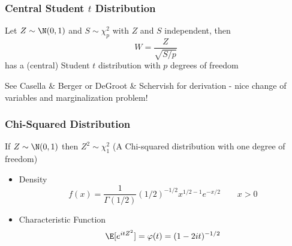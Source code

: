 \documentclass[handout]{beamer}
\begin{document}
\begin{frame}
  \frametitle{Central Student $t$ Distribution}
  \begin{definition}
    Let $Z \sim \N(0, 1)$ and $S \sim \chi^2_p$ with $Z$ and $S$
    independent, \pause then
 $$ W = \frac{Z} {\sqrt{S/p}}$$
has a (central) Student $t$ distribution with $p$ degrees of freedom
  \end{definition}
\pause
 
See Casella \& Berger or DeGroot \& Schervish for derivation - nice change of variables and marginalization problem!
\end{frame}






\begin{frame}
  \frametitle{Chi-Squared Distribution}
  \begin{Definition}
    If $Z \sim \N(0,1)$ then $Z^2 \sim \chi^2_1$ (A Chi-squared
    distribution with one degree of freedom) \pause
    \begin{itemize}
    \item Density
$$
f(x) = \frac{1}{\Gamma(1/2)} (1/2)^{-1/2} x^{1/2 - 1} e^{-x/2} \qquad x
> 0
$$ \pause
  \item  Characteristic Function
$$
\E[e^{itZ^2}] = \varphi(t) = (1 - 2 i t)^{-1/2}
$$
  \end{itemize}

\end{Definition}
\end{frame}
\end{document}
